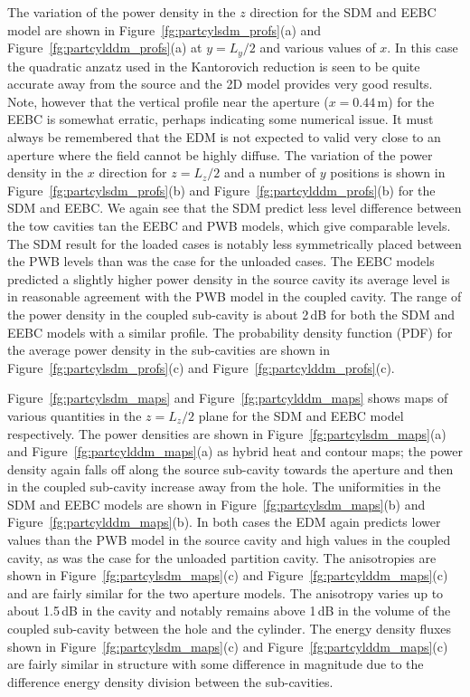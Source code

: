 \documentclass[a4paper]{article}
\numberwithin{equation}{section}
\newcounter{Figure}
\begin{document}
The variation of the power density in the $z$ direction for the SDM and EEBC model are shown in 
Figure~\ref{fg:partcylsdm_profs}(a) and Figure~\ref{fg:partcylddm_profs}(a) at $y=L_y/2$ and various 
values of $x$. In this case the quadratic anzatz used in the Kantorovich reduction
is seen to be quite accurate away from the source and the 2D model provides very good results. Note, however that
the vertical profile near the aperture ($x=0.44$\,m) for the EEBC is somewhat erratic, perhaps indicating 
some numerical issue. It must always be remembered that the EDM is not expected to valid very close to an aperture
where the field cannot be highly diffuse. The variation of the power density in the $x$ direction for $z=L_z/2$ 
and a number of $y$ positions is shown in Figure~\ref{fg:partcylsdm_profs}(b) and 
Figure~\ref{fg:partcylddm_profs}(b) for the SDM and EEBC. We again see that the SDM predict less level difference
between the tow cavities tan the EEBC and PWB models, which give comparable levels. The SDM result for the loaded
cases is notably less symmetrically placed between the PWB levels than was the case for the unloaded cases. 
The EEBC models predicted a slightly higher power density in the source cavity its average level is in reasonable
agreement with the PWB model in the coupled cavity. The range of the power density in the coupled sub-cavity is
about 2\,dB for both the SDM and EEBC models with a similar profile. The probability density function (PDF)
for the average power density in the sub-cavities are shown in Figure~\ref{fg:partcylsdm_profs}(c) and
Figure~\ref{fg:partcylddm_profs}(c).

Figure~\ref{fg:partcylsdm_maps} and Figure~\ref{fg:partcylddm_maps} shows maps of various quantities in 
the $z=L_z/2$ plane for the SDM and EEBC model respectively. The power densities are shown in 
Figure~\ref{fg:partcylsdm_maps}(a) and Figure~\ref{fg:partcylddm_maps}(a) as hybrid heat and contour maps; 
the power density again falls off along the source sub-cavity towards the aperture and then in the coupled
sub-cavity increase away from the hole. The uniformities in the SDM and EEBC models are shown in 
Figure~\ref{fg:partcylsdm_maps}(b) and Figure~\ref{fg:partcylddm_maps}(b). In both cases the EDM again
predicts lower values than the PWB model in the source cavity and high values in the coupled cavity, as was
the case for the unloaded partition cavity. The anisotropies are shown in Figure~\ref{fg:partcylsdm_maps}(c) and
Figure~\ref{fg:partcylddm_maps}(c) and are fairly similar for the two aperture models. The anisotropy varies up to
about 1.5\,dB in the cavity and notably remains above 1\,dB in the volume of the coupled sub-cavity between the 
hole and the cylinder. The energy density fluxes shown in Figure~\ref{fg:partcylsdm_maps}(c) and 
Figure~\ref{fg:partcylddm_maps}(c) are fairly similar in structure with some difference in magnitude due to the 
difference energy density division between the sub-cavities.
\end{document}
